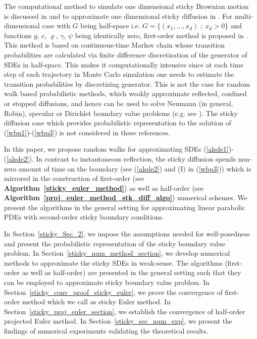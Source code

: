 \documentclass{article}
\theoremstyle{definition}
\numberwithin{equation}{section}
\begin{document}
 The computational method to simulate one dimensional sticky Brownian motion is discussed in \cite{nawaf_miranda20} and to approximate one dimensional sticky diffusion in \cite{w11}. For multi-dimensional case with $G$ being half-space i.e. $G= \{(x_1,\dots,x_d)\; ; \; x_d>0\}$ and functions $g $, $c$, $\varrho $, $\gamma$, $\psi$ being identically zero, first-order method is proposed in \cite{meier2023simulation}. This method is  based on continuous-time Markov chain whose transition probabilities are calculated via finite difference discretization of the generator of SDEs in half-space. This makes it computationally intensive since at each time step of each trajectory in Monte Carlo simulation one needs to estimate the transition probabilities by discretizing generator. This is not the case for random walk based probabilistic methods, which weakly approximate reflected, confined or stopped diffusions, and hence can be used to solve  Neumann (in general, Robin), specular or Dirichlet boundary value problems (e.g. see \cite{1, costantini_pachhiarotti_sartoretto98, 48,64,2,40, gobet2000weak_killed_diff, leimkuhler2023simplerandom, sharma2022random, leimkuhler2024numerical}).  The sticky diffusion case which provides probabilistic representation to the solution of (\ref{wbp1})-(\ref{wbp3}) is not considered in these references. 
 
 In this paper, we propose random walks for approximating SDEs (\ref{alsde1})-(\ref{alsde2}). 
 In contrast to instantaneous reflection, the sticky diffusion spends non-zero amount of time on the boundary (see (\ref{alsde2}) and (I) in (\ref{wbp3})) which is mirrored in the construction of first-order (see \textbf{Algorithm~\ref{sticky_euler_method}}) as well as half-order  (see \textbf{Algorithm~\ref{proj_euler_method_stk_diff_algo}}) numerical schemes. We present the  algorithms in the general setting for approximating linear parabolic PDEs with second-order sticky boundary conditions.




In Section~\ref{sticky_Sec_2}, we impose the assumptions needed for well-posedness and present the probabilistic representation of the sticky boundary value problem.  In Section~\ref{sticky_num_method_section}, we develop numerical methods to approximate the sticky SDEs in weak-sense. The algorithms (first-order as well as half-order) are presented in the general setting such that they can be employed to approximate sticky boundary value problem. In Section~\ref{sticky_conv_proof_sticky_euler}, we prove the convergence of first-order method which we call as  sticky Euler method. In Section~\ref{sticky_proj_euler_section}, we establish the convergence of half-order projected Euler method. In Section~\ref{sticky_sec_num_exp}, we present the findings of numerical experiments validating the theoretical results.
\end{document}

